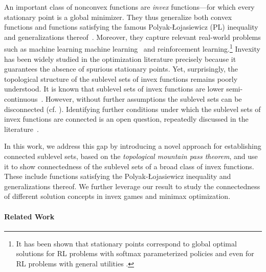 \documentclass{article}
\begin{document}
An important class of nonconvex functions are \emph{invex} functions---for which every stationary point is a global minimizer. They thus generalize both convex functions and functions satisfying the famous Polyak-\L{}ojasiewicz (PL) inequality and generalizations thereof~\citep{Polyak1963Gradient,Lojasiewicz1963Une}. Moreover, they capture relevant real-world problems such as machine learning machine learning~\citep{Nishioka2025Revisiting} and reinforcement learning.\footnote{It has been shown that stationary points correspond to global optimal solutions for RL problems with softmax parameterized policies \citep{Mei2020Global} and even for RL problems with general utilities \citep{Zhang2020Variationala}.} 
Invexity has been widely studied in the optimization literature precisely because it guarantees the absence of spurious stationary points.
Yet, surprisingly, the topological structure of the sublevel sets of invex functions remains poorly understood. It is known that sublevel sets of invex functions are lower semi-continuous~\citep{Zang1977functions}. However, without further assumptions the sublevel sets can be disconnected (cf. ). Identifying further conditions under which the sublevel sets of invex functions are connected is an open question, repeatedly discussed in the literature~\citep{Pini1991Invexity,Pini1994Convexity,Sapkota2021Input,Barik2023Invex}.

In this work, we address this gap by introducing a novel approach for establishing connected sublevel sets, based on the \textit{topological mountain pass theorem}, and use it to show connectedness of the sublevel sets of a broad class of invex functions. These include functions satisfying the Polyak-\L{}ojasiewicz inequality and generalizations thereof.
We further leverage our result to study the connectedness of different solution concepts in invex games and minimax optimization.



























\paragraph{Related Work}
\end{document}
